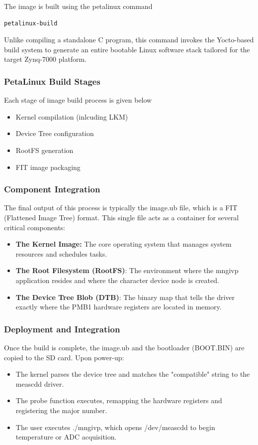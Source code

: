 The image is built using the petalinux command 
\begin{verbatim}
petalinux-build
\end{verbatim}

Unlike compiling a standalone C program, this command invokes the Yocto-based build system to generate an entire bootable Linux software stack tailored for the target Zynq-7000 platform.

\subsubsection{PetaLinux Build Stages}
Each stage of image build process is given below
\begin{itemize}
\item Kernel compilation (inlcuding LKM)
\item Device Tree configuration
\item RootFS generation
\item FIT image packaging
\end{itemize}




\subsubsection{Component Integration}
The final output of this process is typically the image.ub file, which is a FIT (Flattened Image Tree) format. This single file acts as a container for several critical components:

\begin{itemize}
\item \textbf{The Kernel Image:} The core operating system that manages system resources and schedules tasks.
\item \textbf{The Root Filesystem (RootFS)}: The environment where the mngivp application resides and where the character device node is created.
\item \textbf{The Device Tree Blob (DTB)}: The binary map that tells the driver exactly where the PMB1 hardware registers are located in memory.
\end{itemize}

\subsubsection{Deployment and Integration}
Once the build is complete, the image.ub and the bootloader (BOOT.BIN) are copied to the SD card. Upon power-up:
\begin{itemize}
\item The kernel parses the device tree and matches the "compatible" string to the meascdd driver.
\item The probe function executes, remapping the hardware registers and registering the major number.
\item The user executes ./mngivp, which opens /dev/meascdd to begin temperature or ADC acquisition.
\end{itemize}

